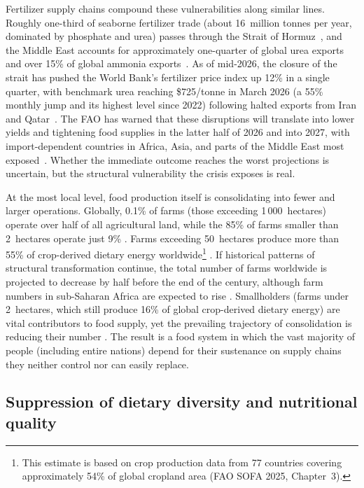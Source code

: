 Fertilizer supply chains compound these vulnerabilities along similar lines. Roughly one-third of seaborne fertilizer trade (about 16~million tonnes per year, dominated by phosphate and urea) passes through the Strait of Hormuz~\cite[p.~7]{unctad2026hormuz}, and the Middle East accounts for approximately one-quarter of global urea exports and over 15\% of global ammonia exports~\cite[p.~34]{worldbank2026cmo}. As of mid-2026, the closure of the strait has pushed the World Bank's fertilizer price index up 12\% in a single quarter, with benchmark urea reaching \$725/tonne in March 2026 (a 55\% monthly jump and its highest level since 2022) following halted exports from Iran and Qatar~\cite[p.~34]{worldbank2026cmo}. The FAO has warned that these disruptions will translate into lower yields and tightening food supplies in the latter half of 2026 and into 2027, with import-dependent countries in Africa, Asia, and parts of the Middle East most exposed~\cite{fao2026hormuz}. Whether the immediate outcome reaches the worst projections is uncertain, but the structural vulnerability the crisis exposes is real.

At the most local level, food production itself is consolidating into
fewer and larger operations. Globally, 0.1\% of farms (those exceeding
1\,000~hectares) operate over half of all agricultural land, while the
85\% of farms smaller than 2~hectares operate just 9\%
\cite[Chapter~3]{fao2025sofa}. Farms exceeding 50~hectares produce more than 55\% of crop-derived
dietary energy worldwide\footnote{This estimate is based on crop
production data from 77 countries covering approximately 54\% of global
cropland area (FAO SOFA 2025, Chapter~3).} \cite[Chapter~3]{fao2025sofa}. If historical patterns of structural transformation continue, the total
number of farms worldwide is projected to decrease by half before the end
of the century, although farm numbers in sub-Saharan Africa are expected
to rise \cite[Chapter~3]{fao2025sofa}. Smallholders (farms under
2~hectares, which still produce 16\% of global crop-derived dietary
energy) are vital contributors to food supply, yet the prevailing
trajectory of consolidation is reducing their number
\cite[Chapter~3]{fao2025sofa}. The result is a food system in which the
vast majority of people (including entire nations) depend for their
sustenance on supply chains they neither control nor can easily replace.

\subsection{Suppression of dietary diversity and nutritional quality}\label{sec:nutrition}

